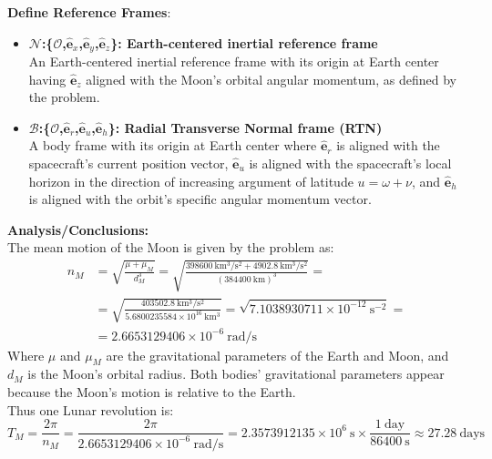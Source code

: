 \documentclass[titlepage]{article}
\begin{document}
\textbf{Define Reference Frames}:
\begin{itemize}
	\item \textbf{$\mathcal{N}$:\{$\mathcal{O}$,$\hat{\boldsymbol{e}}_x$,$\hat{\boldsymbol{e}}_y$,$\hat{\boldsymbol{e}}_z$\}: Earth-centered inertial reference frame\\}An Earth-centered inertial reference frame with its origin at Earth center having $\hat{\boldsymbol{e}}_z$ aligned with the Moon's orbital angular momentum, as defined by the problem.
	\item \textbf{$\mathcal{B}$:\{$\mathcal{O}$,$\hat{\boldsymbol{e}}_r$,$\hat{\boldsymbol{e}}_u$,$\hat{\boldsymbol{e}}_h$\}: Radial Transverse Normal frame (RTN)\\}A body frame with its origin at Earth center where $\hat{\boldsymbol{e}}_r$ is aligned with the spacecraft's current position vector, $\hat{\boldsymbol{e}}_u$ is aligned with the spacecraft's local horizon in the direction of increasing argument of latitude $u=\omega+\nu$, and $\hat{\boldsymbol{e}}_h$ is aligned with the orbit's specific angular momentum vector.
\end{itemize}

\textbf{Analysis/Conclusions:}\\

The mean motion of the Moon is given by the problem as:
\begin{equation}
	\begin{split}
		n_M&=\sqrt{\frac{\mu+\mu_M}{d_M^3}}=\sqrt{\frac{398600\ \mathrm{km^3/s^2}+4902.8\ \mathrm{km^3/s^2}}{(384400\ \mathrm{km})^3}}= \\
		&=\sqrt{\frac{403502.8\ \mathrm{km^3/s^2}}{5.6800235584\times10^{16}\ \mathrm{km^3}}}=\sqrt{7.1038930711\times10^{-12}\ \mathrm{s^{-2}}}= \\
		&=2.6653129406\times10^{-6}\ \mathrm{rad/s}
	\end{split}
\end{equation}
Where $\mu$ and $\mu_M$ are the gravitational parameters of the Earth and Moon, and $d_M$ is the Moon's orbital radius. Both bodies' gravitational parameters appear because the Moon's motion is relative to the Earth. \\

Thus one Lunar revolution is:
\begin{equation}
	T_M=\frac{2\pi}{n_M}=\frac{2\pi}{2.6653129406\times10^{-6}\ \mathrm{rad/s}}=2.3573912135\times10^{6}\ \mathrm{s}\times\frac{1\ \mathrm{day}}{86400\ \mathrm{s}}\approx27.28\ \mathrm{days}
\end{equation}
\end{document}
